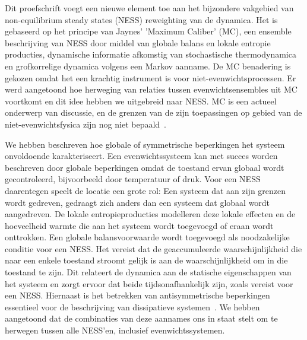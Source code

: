 % 
% 
% 
% 
% 
% 
% 

Dit proefschrift voegt een nieuwe element toe aan het bijzondere vakgebied van non-equilibrium steady states (NESS) reweighting van de dynamica. Het is gebaseerd op het principe van Jaynes' 'Maximum Caliber' (MC), een ensemble beschrijving van NESS door middel van globale balans en lokale entropie producties, dynamische informatie afkomstig van stochastische thermodynamica en grofkorrelige dynamica volgens een Markov aanname. De MC benadering is gekozen omdat het een krachtig instrument is voor niet-evenwichtsprocessen. Er werd aangetoond hoe herweging van relaties tussen evenwichtsensembles uit MC voortkomt en dit idee hebben we uitgebreid naar NESS. MC is een actueel onderwerp van discussie, en de grenzen van de zijn toepassingen op gebied van de niet-evenwichtsfysica zijn nog niet bepaald~\cite{ghosh2020maximum}.

We hebben beschreven hoe globale of symmetrische beperkingen het systeem onvoldoende karakteriseert. Een evenwichtssysteem kan met succes worden beschreven door globale beperkingen omdat de toestand ervan globaal wordt gecontroleerd, \mbox{bij}voorbeeld door temperatuur of druk. Voor een NESS daarentegen speelt de  locatie een grote rol: Een systeem dat aan zijn grenzen wordt gedreven, gedraagt zich anders dan een systeem dat globaal wordt aangedreven. De lokale entropieproducties modelleren deze lokale effecten en de hoeveelheid warmte die aan het systeem wordt toegevoegd of eraan wordt onttrokken. Een globale balansvoorwaarde wordt toegevoegd als noodzakelijke conditie voor een NESS. Het vereist dat de geaccumuleerde waarschijnlijkheid die naar een enkele toestand stroomt gelijk is aan de waarschijnlijkheid om in die toestand te zijn. Dit relateert de dynamica aan de statische eigenschappen van het systeem en zorgt ervoor dat beide tijdsonafhankelijk zijn, zoals vereist voor een NESS. Hiernaast is het betrekken van antisymmetrische beperkingen essentieel voor de beschrijving van dissipatieve systemen~\cite{agozzino2019minimal}. We hebben aangetoond dat de combinaties van deze aannames ons in staat stelt om te herwegen tussen alle NESS'en, inclusief evenwichtssystemen.

